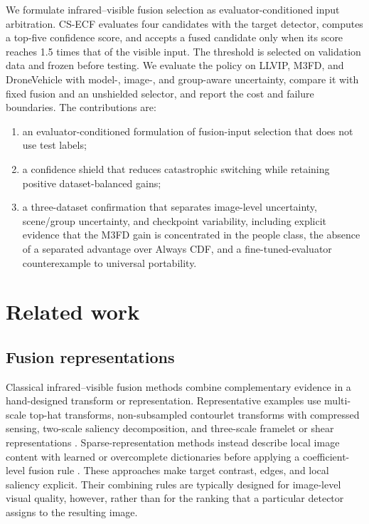 \documentclass[preprint,11pt]{elsarticle}
\begin{document}
We formulate infrared--visible fusion selection as evaluator-conditioned input
arbitration. CS-ECF evaluates four candidates with the target detector, computes
a top-five confidence score, and accepts a fused candidate only when its score
reaches 1.5 times that of the visible input. The threshold is selected on
validation data and frozen before testing. We evaluate the policy on LLVIP,
M3FD, and DroneVehicle with model-, image-, and group-aware uncertainty,
compare it with fixed fusion and an unshielded selector, and report the cost and
failure boundaries. The contributions are:
\begin{enumerate}
  \item an evaluator-conditioned formulation of fusion-input selection that does
  not use test labels;
  \item a confidence shield that reduces catastrophic switching while retaining
  positive dataset-balanced gains;
  \item a three-dataset confirmation that separates image-level uncertainty,
  scene/group uncertainty, and checkpoint variability, including explicit
  evidence that the M3FD gain is concentrated in the people class, the absence
  of a separated advantage over Always CDF, and a fine-tuned-evaluator
  counterexample to universal portability.
\end{enumerate}

\section{Related work}

\subsection{Fusion representations}

Classical infrared--visible fusion methods combine complementary evidence in a
hand-designed transform or representation. Representative examples use
multi-scale top-hat transforms, non-subsampled contourlet transforms with
compressed sensing, two-scale saliency decomposition, and three-scale framelet
or shear representations \cite{zhu2017tophat,zhang2016nsct,zhang2021twoscale,wei2017threescale}.
Sparse-representation methods instead describe local image content with learned
or overcomplete dictionaries before applying a coefficient-level fusion rule
\cite{yin2013sparsefusion,yin2015multiscale}. These approaches make target
contrast, edges, and local saliency explicit. Their combining rules are
typically designed for image-level visual quality, however, rather than for the
ranking that a particular detector assigns to the resulting image.
\end{document}
